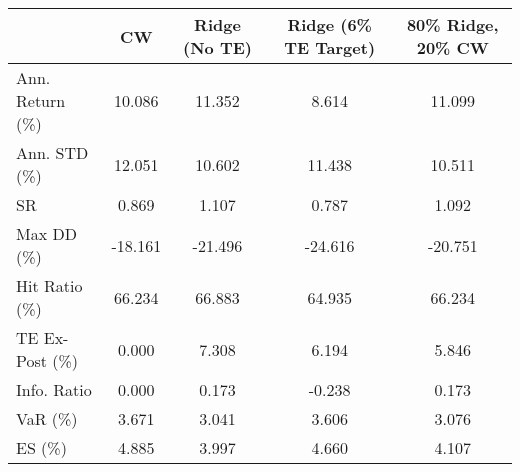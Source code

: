 \begin{tabular}{lcccc}
\toprule
{} &      CW &  Ridge (No TE) &  Ridge (6\% TE Target) &  80\% Ridge, 20\% CW \\
\midrule
Ann. Return (\%) &  10.086 &         11.352 &                 8.614 &             11.099 \\
Ann. STD (\%)    &  12.051 &         10.602 &                11.438 &             10.511 \\
SR              &   0.869 &          1.107 &                 0.787 &              1.092 \\
Max DD (\%)      & -18.161 &        -21.496 &               -24.616 &            -20.751 \\
Hit Ratio (\%)   &  66.234 &         66.883 &                64.935 &             66.234 \\
TE Ex-Post (\%)  &   0.000 &          7.308 &                 6.194 &              5.846 \\
Info. Ratio     &   0.000 &          0.173 &                -0.238 &              0.173 \\
VaR (\%)         &   3.671 &          3.041 &                 3.606 &              3.076 \\
ES (\%)          &   4.885 &          3.997 &                 4.660 &              4.107 \\
\bottomrule
\end{tabular}
